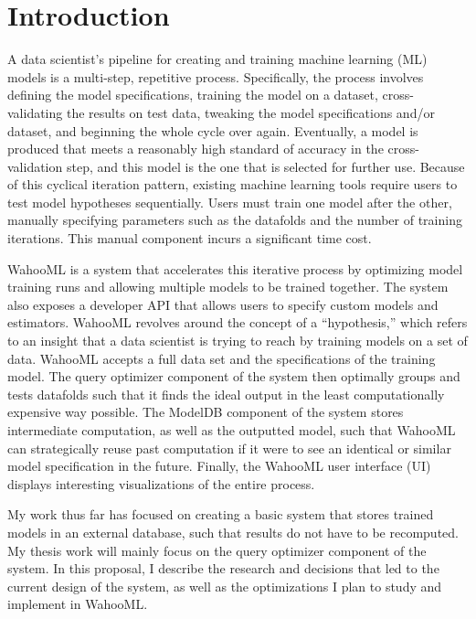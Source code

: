 \documentclass[../proposal.tex]{subfiles}
\begin{document}
\section{Introduction}

A data scientist's pipeline for creating and training machine learning (ML)
models is a multi-step, repetitive process. Specifically, the process involves 
defining the model specifications, training the model on a dataset, cross-
validating the results on test data, tweaking the model specifications and/or
dataset, and beginning the whole cycle over again. Eventually, a model is 
produced that meets a reasonably high standard of accuracy in the cross-
validation step, and this model is the one that is selected for further use.
Because of this cyclical iteration pattern, existing machine learning tools
require users to test model hypotheses sequentially. Users must train one model
after the other, manually specifying parameters such as the datafolds and the
number of training iterations. This manual component incurs a significant time
cost. 

WahooML is a system that accelerates this iterative process by optimizing model
training runs and allowing multiple models to be trained together. The
system also exposes a developer API that allows users to specify custom models
and estimators. WahooML revolves around the concept of a ``hypothesis,'' which
refers to an insight that a data scientist is trying to reach by training
models on a set of data. WahooML accepts a full data set and the specifications
of the training model. The query optimizer component of the system then
optimally groups and tests datafolds such that it finds the ideal output in the
least computationally expensive way possible. The ModelDB component of the
system stores intermediate computation, as well as the outputted model, such
that WahooML can strategically reuse past computation if it were to see an
identical or similar model specification in the future. Finally, the WahooML
user interface (UI) displays interesting visualizations of the entire process.

My work thus far has focused on creating a basic system that stores trained
models in an external database, such that results do not have to be recomputed.
My thesis work will mainly focus on the query optimizer component of the
system. In this proposal, I describe the research and decisions that led to the
current design of the system, as well as the optimizations I plan to study and
implement in WahooML.
\end{document}
